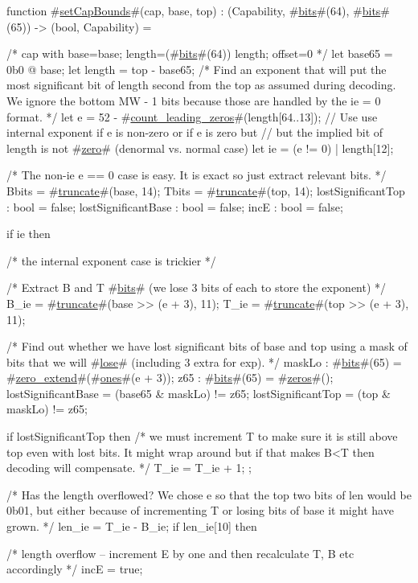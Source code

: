 function #\hyperref[sailMIPSzsetCapBounds]{setCapBounds}#(cap, base, top) : (Capability, #\hyperref[sailMIPSzbits]{bits}#(64), #\hyperref[sailMIPSzbits]{bits}#(65)) -> (bool, Capability) = {
  /* {cap with base=base; length=(#\hyperref[sailMIPSzbits]{bits}#(64)) length; offset=0} */
  let base65 = 0b0 @ base;
  let length = top - base65;
  /* Find an exponent that will put the most significant bit of length
     second from the top as assumed during decoding. We ignore the bottom
     MW - 1 bits because those are handled by the ie = 0 format. */
  let e = 52 - #\hyperref[sailMIPSzcountzyleadingzyzzeros]{count\_leading\_zeros}#(length[64..13]);
  // Use use internal exponent if e is non-zero or if e is zero but
  // but the implied bit of length is not #\hyperref[sailMIPSzzzero]{zero}# (denormal vs. normal case)
  let ie = (e != 0) | length[12];

  /* The non-ie e == 0 case is easy. It is exact so just extract relevant bits. */
  Bbits = #\hyperref[sailMIPSztruncate]{truncate}#(base, 14);
  Tbits = #\hyperref[sailMIPSztruncate]{truncate}#(top, 14);
  lostSignificantTop  : bool = false;
  lostSignificantBase : bool = false;
  incE : bool = false;

  if ie then {
    /* the internal exponent case is trickier */

    /* Extract B and T #\hyperref[sailMIPSzbits]{bits}# (we lose 3 bits of each to store the exponent) */
    B_ie = #\hyperref[sailMIPSztruncate]{truncate}#(base >> (e + 3), 11);
    T_ie = #\hyperref[sailMIPSztruncate]{truncate}#(top >> (e + 3), 11);

    /* Find out whether we have lost significant bits of base and top using a
       mask of bits that we will #\hyperref[sailMIPSzlose]{lose}# (including 3 extra for exp). */
    maskLo : #\hyperref[sailMIPSzbits]{bits}#(65) = #\hyperref[sailMIPSzzzerozyextend]{zero\_extend}#(#\hyperref[sailMIPSzones]{ones}#(e + 3));
    z65    : #\hyperref[sailMIPSzbits]{bits}#(65) = #\hyperref[sailMIPSzzzeros]{zeros}#();
    lostSignificantBase = (base65 & maskLo) != z65;
    lostSignificantTop = (top & maskLo) != z65;

    if lostSignificantTop then {
      /* we must increment T to make sure it is still above top even with lost bits.
         It might wrap around but if that makes B<T then decoding will compensate. */
      T_ie = T_ie + 1;
    };

    /* Has the length overflowed? We chose e so that the top two bits of len would be 0b01,
       but either because of incrementing T or losing bits of base it might have grown. */
    len_ie = T_ie - B_ie;
    if len_ie[10] then {
      /* length overflow -- increment E by one and then recalculate
         T, B etc accordingly */
      incE = true;

}}}

